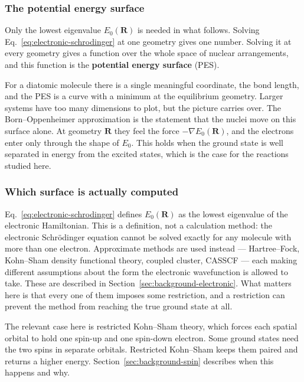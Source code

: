 \subsubsection*{The potential energy surface}
Only the lowest eigenvalue $E_0(\mathbf{R})$ is needed in what follows. Solving
Eq.~\eqref{eq:electronic-schrodinger} at one geometry gives one number. Solving it
at every geometry gives a function over the whole space of nuclear arrangements,
and this function is the \textbf{potential energy surface} (PES).

\medskip

For a diatomic molecule there is a single meaningful coordinate, the bond length,
and the PES is a curve with a minimum at the equilibrium geometry. Larger systems
have too many dimensions to plot, but the picture carries over. 
The Born--Oppenheimer approximation is the statement that the nuclei move on this
surface alone. At geometry $\mathbf{R}$ they feel the force
$-\nabla E_0(\mathbf{R})$, and the electrons enter only through the shape of
$E_0$. This holds when the ground state is well separated in energy from the
excited states, which is the case for the reactions studied here.

\subsubsection*{Which surface is actually computed}
Eq.~\eqref{eq:electronic-schrodinger} defines $E_0(\mathbf{R})$ as the lowest
eigenvalue of the electronic Hamiltonian. This is a definition, not a calculation method: the
electronic Schrödinger equation cannot be solved exactly for any molecule with
more than one electron. Approximate methods are used instead --- Hartree--Fock,
Kohn--Sham density functional theory, coupled cluster, CASSCF --- each making
different assumptions about the form the electronic wavefunction is allowed to
take. These are described in Section~\ref{sec:background-electronic}. What matters
here is that every one of them imposes some restriction, and a restriction can
prevent the method from reaching the true ground state at all.

The relevant case here is restricted Kohn--Sham theory, which forces each spatial
orbital to hold one spin-up and one spin-down electron. Some ground states need
the two spins in separate orbitals. Restricted Kohn--Sham keeps them paired and
returns a higher energy. Section~\ref{sec:background-spin} describes when this
happens and why.

